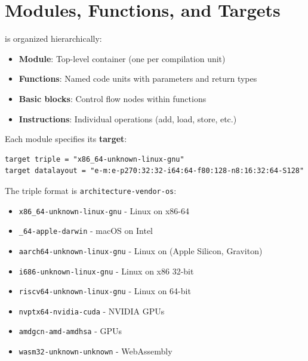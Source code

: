 \section{Modules, Functions, and Targets}

  is organized hierarchically:
\begin{itemize}[noitemsep]
  \item \textbf{Module}: Top-level container (one per compilation unit)
  \item \textbf{Functions}: Named code units with parameters and return types
  \item \textbf{Basic blocks}: Control flow nodes within functions
  \item \textbf{Instructions}: Individual operations (add, load, store, etc.)
\end{itemize}

Each module specifies its \textbf{target}:
\begin{lstlisting}[style=ir]
target triple = "x86_64-unknown-linux-gnu"
target datalayout = "e-m:e-p270:32:32-i64:64-f80:128-n8:16:32:64-S128"
\end{lstlisting}

The triple format is \texttt{architecture-vendor-os}:
\begin{itemize}[noitemsep]
  \item \texttt{x86\_64-unknown-linux-gnu} - Linux on x86-64
  \item \texttt{\_64-apple-darwin} - macOS on Intel
  \item \texttt{aarch64-unknown-linux-gnu} - Linux on  (Apple Silicon,  Graviton)
  \item \texttt{i686-unknown-linux-gnu} - Linux on x86 32-bit
  \item \texttt{riscv64-unknown-linux-gnu} - Linux on  64-bit
  \item \texttt{nvptx64-nvidia-cuda} - NVIDIA GPUs
  \item \texttt{amdgcn-amd-amdhsa} -  GPUs
  \item \texttt{wasm32-unknown-unknown} - WebAssembly
\end{itemize}

